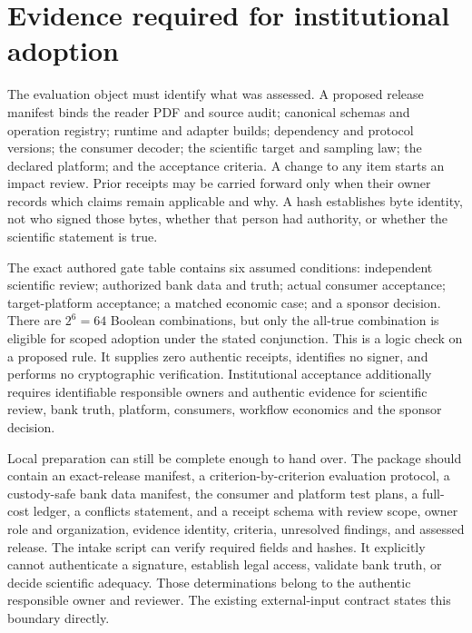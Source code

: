 \section{Evidence required for institutional adoption}
\label{exec17:signed-adoption}

The evaluation object must identify what was assessed. A proposed release
manifest binds the reader PDF and source audit; canonical schemas and operation
registry; runtime and adapter builds; dependency and protocol versions; the
consumer decoder; the scientific target and sampling law; the declared
platform; and the acceptance criteria. A change to any item starts an impact
review. Prior receipts may be carried forward only when their owner records
which claims remain applicable and why. A hash establishes byte identity, not
who signed those bytes, whether that person had authority, or whether the
scientific statement is true.

The exact authored gate table contains six assumed conditions: independent
scientific review; authorized bank data and truth; actual consumer acceptance;
target-platform acceptance; a matched economic case; and a sponsor decision.
There are $2^6=64$ Boolean combinations, but only the all-true combination is
eligible for scoped adoption under the stated conjunction. This is a logic
check on a proposed rule. It supplies zero authentic receipts, identifies no
signer, and performs no cryptographic verification. Institutional acceptance additionally requires identifiable responsible
owners and authentic evidence for scientific review, bank truth, platform,
consumers, workflow economics and the sponsor decision.~\citep{exec17_continuity_reference,exec17_continuity_contract}

Local preparation can still be complete enough to hand over. The package
should contain an exact-release manifest, a criterion-by-criterion evaluation
protocol, a custody-safe bank data manifest, the consumer and platform test
plans, a full-cost ledger, a conflicts statement, and a receipt schema with
review scope, owner role and organization, evidence identity, criteria,
unresolved findings, and assessed release. The intake script can verify
required fields and hashes. It explicitly cannot authenticate a signature,
establish legal access, validate bank truth, or decide scientific adequacy.
Those determinations belong to the authentic responsible owner and reviewer.
The existing external-input contract states this boundary directly.
\citep{exec17_continuity_contract}

